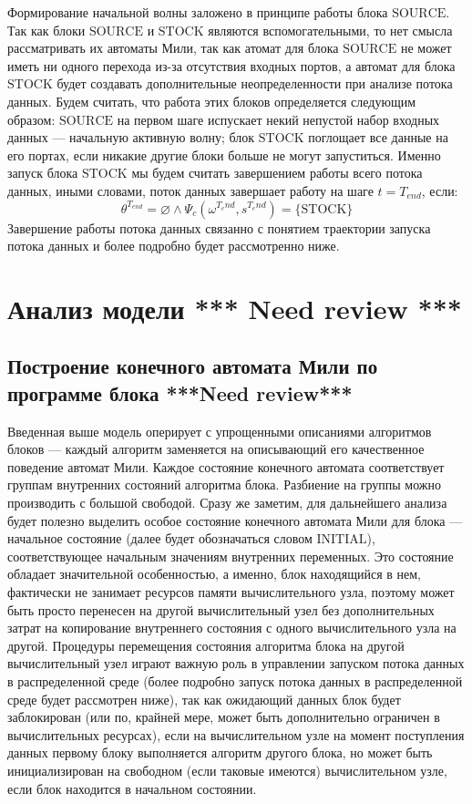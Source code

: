 \documentclass[10pt,a4paper]{article}
\newcommand{\stock}{\text{STOCK}}
\newcommand{\source}{\text{SOURCE}}
\newcommand{\initial}{\text{INITIAL}}
\begin{document}
  Формирование начальной волны заложено в принципе работы блока $\source$.
  Так как блоки $\source$ и $\stock$ являются вспомогательными, то нет смысла рассматривать их автоматы Мили, так как атомат для блока $\source$ не может иметь ни одного перехода
  из-за отсутствия входных портов, а автомат для блока $\stock$ будет создавать дополнительные неопределенности при анализе потока данных.
  Будем считать, что работа этих блоков определяется следующим образом: $\source$ на первом шаге испускает некий непустой набор входных данных --- начальную активную волну;
  блок $\stock$ поглощает все данные на его портах, если никакие другие блоки больше не могут запуститься. Именно запуск блока $\stock$ мы будем считать завершением работы
  всего потока данных, иными словами, поток данных завершает работу на шаге $t = T_{end}$, если:
  \begin{equation}
    \theta^{T_{end}} = \varnothing \wedge \Psi_c(\omega^{T_end}, s^{T_end}) = \{\stock\}
    \label{end_of_workflow}
  \end{equation}
  Завершение работы потока данных связанно с понятием траектории запуска потока данных и более подробно будет рассмотренно ниже.

\section{Анализ модели \textbf{*** Need review ***}}
\subsection{Построение конечного автомата Мили по программе блока \textbf{***Need review***}}
Введенная выше модель оперирует с упрощенными описаниями алгоритмов блоков --- каждый алгоритм заменяется на описывающий его качественное поведение автомат Мили.
Каждое состояние конечного автомата соответствует группам внутренних состояний алгоритма блока. Разбиение на группы можно производить с большой свободой.
Сразу же заметим, для дальнейшего анализа будет полезно выделить особое состояние конечного автомата Мили для блока --- начальное состояние (далее будет обозначаться словом $\initial$), соответствующее начальным значениям внутренних переменных. Это состояние обладает значительной особенностью, а именно, блок находящийся в нем, фактически
не занимает ресурсов памяти вычислительного узла, поэтому может быть просто перенесен на другой вычислительный узел без дополнительных затрат
на копирование внутреннего состояния с одного вычислительного узла на другой. Процедуры перемещения состояния алгоритма блока на другой
вычислительный узел играют важную роль в управлении запуском потока данных в распределенной среде (более подробно запуск потока данных в распределенной среде будет рассмотрен ниже), так как ожидающий данных блок будет заблокирован (или по, крайней мере, может быть дополнительно ограничен в вычислительных ресурсах),
если на вычислительном узле на момент поступления данных первому блоку выполняется алгоритм другого блока, но может быть инициализирован на свободном
(если таковые имеются) вычислительном узле, если блок находится в начальном состоянии.
\end{document}
